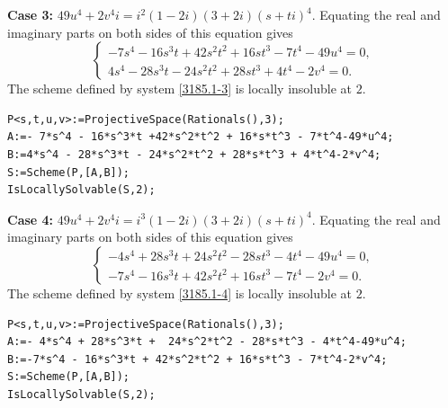 \documentclass[a4paper,12pt,english,reqno]{amsart}
\begin{document}
{\bf Case 3:} $49u^4+2v^4i=i^2(1-2i)(3+2i)(s+ti)^4$. Equating the real and imaginary parts on both sides of this equation gives
\begin{equation}\label{3185.1-3}
\begin{cases}
-7s^4 - 16s^3t + 42s^2t^2 + 16st^3 - 7t^4 - 49u^4=0,\\
4s^4 - 28s^3t - 24s^2t^2 + 28st^3 + 4t^4 - 2v^4=0.
\end{cases}
\end{equation}
The scheme defined by system \eqref{3185.1-3} is locally insoluble at $2$.

\begin{lstlisting}
P<s,t,u,v>:=ProjectiveSpace(Rationals(),3);
A:=- 7*s^4 - 16*s^3*t +42*s^2*t^2 + 16*s*t^3 - 7*t^4-49*u^4;
B:=4*s^4 - 28*s^3*t - 24*s^2*t^2 + 28*s*t^3 + 4*t^4-2*v^4;
S:=Scheme(P,[A,B]);
IsLocallySolvable(S,2);
\end{lstlisting}
{\bf Case 4:} $49u^4+2v^4i=i^3(1-2i)(3+2i)(s+ti)^4$. Equating the real and imaginary parts on both sides of this equation gives
\begin{equation}\label{3185.1-4}
\begin{cases}
-4s^4 + 28s^3t + 24s^2t^2 - 28st^3 - 4t^4 - 49u^4=0,\\
-7s^4 - 16s^3t + 42s^2t^2 + 16st^3 - 7t^4 - 2v^4=0.
\end{cases}
\end{equation}
The scheme defined by system \eqref{3185.1-4} is locally insoluble at $2$.
%

\begin{lstlisting}
P<s,t,u,v>:=ProjectiveSpace(Rationals(),3);
A:=- 4*s^4 + 28*s^3*t +  24*s^2*t^2 - 28*s*t^3 - 4*t^4-49*u^4;
B:=-7*s^4 - 16*s^3*t + 42*s^2*t^2 + 16*s*t^3 - 7*t^4-2*v^4;
S:=Scheme(P,[A,B]);
IsLocallySolvable(S,2);
\end{lstlisting}
\end{document}
